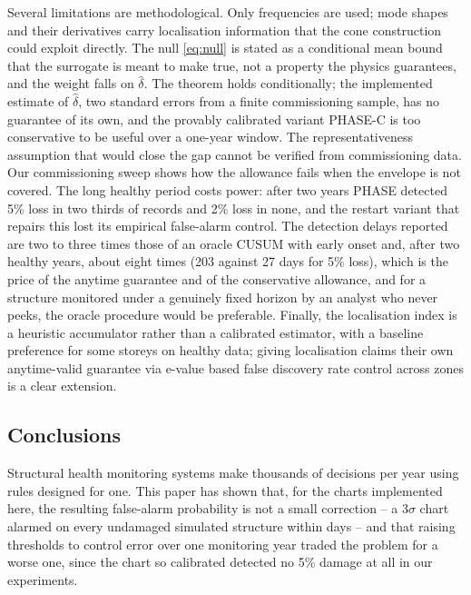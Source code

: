 \documentclass[12pt,a4paper]{article}
\newcommand{\rev}[1]{#1}
\newcommand{\rev}[1]{{\color{revcol}#1}}
\begin{document}
Several limitations are methodological. Only frequencies are used; mode shapes and their derivatives carry localisation information that the cone construction could exploit directly. The null \eqref{eq:null} is stated as a conditional mean bound \rev{that the surrogate is meant to make true, not a property the physics guarantees}, and the weight falls on $\hat\delta$. \rev{The theorem holds conditionally; the implemented estimate of $\hat\delta$, two standard errors from a finite commissioning sample, has no guarantee of its own, and the provably calibrated variant PHASE-C is too conservative to be useful over a one-year window. The representativeness assumption that would close the gap cannot be verified from commissioning data.} Our commissioning sweep shows how the allowance fails when the envelope is not covered. \rev{The long healthy period costs power: after two years PHASE detected 5\% loss in two thirds of records and 2\% loss in none, and the restart variant that repairs this lost its empirical false-alarm control.} The detection delays reported are two to three times those of an oracle CUSUM with early onset and, after two healthy years, about eight times (203 against 27 days for 5\% loss), which is the price of the anytime guarantee and of the conservative allowance, and for a structure monitored under a genuinely fixed horizon by an analyst who never peeks, the oracle procedure would be preferable. Finally, the localisation index is a heuristic accumulator rather than a calibrated estimator, \rev{with a baseline preference for some storeys on healthy data}; giving localisation claims their own anytime-valid guarantee via e-value based false discovery rate control across zones is a clear extension.

\subsection{Conclusions}\label{sec:concl}

Structural health monitoring systems make thousands of decisions per year using rules designed for one. This paper has shown that, \rev{for the charts implemented here,} the resulting false-alarm probability is not a small correction -- a $3\sigma$ chart alarmed on every undamaged simulated structure within days -- and that raising thresholds to control error over one monitoring year traded the problem for a worse one, since the chart so calibrated detected no 5\% damage at all in our experiments.
\end{document}
